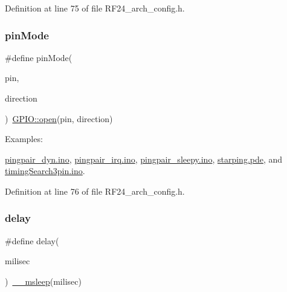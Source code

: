 Definition at line 75 of file R\+F24\+\_\+arch\+\_\+config.\+h.

\mbox{\label{group__Porting__General_ga361649efb4f1e2fa3c870ca203497d5e}} 
\subsubsection{\texorpdfstring{pin\+Mode}{pinMode}}
{\footnotesize\ttfamily \#define pin\+Mode(\begin{DoxyParamCaption}\item[{}]{pin,  }\item[{}]{direction }\end{DoxyParamCaption})~\hyperlink{group__Porting__GPIO_gad3451cca241dbbf42bf381129385a35c}{G\+P\+I\+O\+::open}(pin, direction)}

\begin{Desc}
\item[Examples\+: ]\par
\hyperlink{pingpair_dyn_8ino-example}{pingpair\+\_\+dyn.\+ino}, \hyperlink{pingpair_irq_8ino-example}{pingpair\+\_\+irq.\+ino}, \hyperlink{pingpair_sleepy_8ino-example}{pingpair\+\_\+sleepy.\+ino}, \hyperlink{starping_8pde-example}{starping.\+pde}, and \hyperlink{timingSearch3pin_8ino-example}{timing\+Search3pin.\+ino}.\end{Desc}


Definition at line 76 of file R\+F24\+\_\+arch\+\_\+config.\+h.

\mbox{\label{group__Porting__General_ga70a331e8ddf9acf9d33c47b71cda4c5f}} 
\subsubsection{\texorpdfstring{delay}{delay}}
{\footnotesize\ttfamily \#define delay(\begin{DoxyParamCaption}\item[{}]{milisec }\end{DoxyParamCaption})~\hyperlink{group__Porting__Timing_ga4c2e4dffa20576f5b3d9c2f9bb052106}{\+\_\+\+\_\+msleep}(milisec)}

